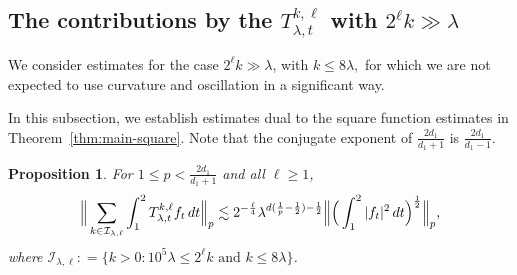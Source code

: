 \documentclass[leqno]{amsart}
\newtheorem{proposition}[theorem]{Proposition}
\theoremstyle{definition}
\theoremstyle{remark}
\numberwithin{equation}{section}
\newcommand\lc{\lesssim}
\newcommand\la{{\lambda}}
\begin{document}
\subsection{The contributions by the  $T^{k,\ell}_{\la,t}$ with $2^\ell k \gg\lambda$}

We consider estimates for the case  $2^\ell k\gg\lambda$, with $k\le 8\la,$ for which we are not expected to use curvature and oscillation in a significant way.

In this subsection, we establish estimates dual to the square function estimates in Theorem~\ref{thm:main-square}. Note that the conjugate exponent of $\frac{2d_1}{d_1+1}$ is $\frac{2d_1}{d_1-1}$.

\begin{proposition}\label{prop:near}
For $1\le p < \frac{2d_1}{d_1 + 1}$ and all $\ell\ge 1$,
\[
\Big\| \sum_{k\in\mathcal I_{\lambda,\ell}} 
\int_1^2 T^{k,\ell}_{\la,t}f_t \, dt \Big\|_p\\
\lc  2^{-\frac{\ell}4} \la^{d(\frac 1p-\frac 12)-\frac 12}
\Big\| \Big(\int_1^2 | f_t|^2 \, dt\Big)^{\frac{1}{2}} \Big\|_p,
\]
where $ \mathcal I_{\lambda,\ell} : = \{k > 0 : 10^5 \lambda \le 2^\ell k \text{ and }k\le 8\lambda\}$.
\end{proposition}
\end{document}
